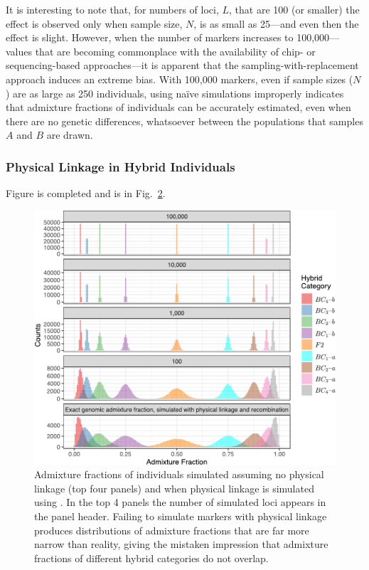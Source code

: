 {\begin{figure}
\caption[\biassimscap]{\biassimscap}
\label{fig:bias-sims}
\end{figure}
It is interesting to note
that, for numbers of loci,  $L$, that are 100 (or smaller) the effect is observed only when
sample size, $N$, is as small as 25---and even then the effect is slight.  However, when the
number of markers increases to 100,000---values that are becoming commonplace with the availability of chip-
or sequencing-based approaches---it is apparent that the sampling-with-replacement approach
induces an extreme bias.  With 100,000 markers, even if sample sizes ($N$) are as large as 250 individuals,
using na\"{i}ve simulations improperly indicates that admixture fractions of individuals can be
accurately estimated, even when there are no genetic differences, whatsoever between the populations that
samples $A$ and $B$ are drawn.

\subsubsection*{Physical Linkage in Hybrid Individuals}

Figure is completed and is in Fig.~\ref{fig:ad-fract-sims}.
\begin{figure}
\newcommand{\adfcap}{\footnotesize Admixture fractions of individuals simulated
assuming no physical linkage (top four panels)
and when physical linkage is simulated using \gscramble{}.  In the top 4 panels the number
of simulated loci appears in the panel header.  Failing to simulate markers with physical linkage
produces distributions of admixture fractions that are far more narrow than reality, giving the
mistaken impression that admixture fractions of different hybrid categories do not overlap.  }
\includegraphics[width=\columnwidth]{figures/link-and-nolink-sims-crop.pdf}
\caption[\adfcap]{\adfcap}
\label{fig:ad-fract-sims}
\end{figure}
}
